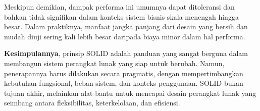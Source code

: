 Meskipun demikian, dampak performa ini umumnya dapat ditoleransi dan bahkan tidak signifikan dalam konteks sistem bisnis skala menengah hingga besar. Dalam praktiknya, manfaat jangka panjang dari desain yang bersih dan mudah diuji sering kali lebih besar daripada biaya minor dalam hal performa.

\textbf{Kesimpulannya}, prinsip SOLID adalah panduan yang sangat berguna dalam membangun sistem perangkat lunak yang siap untuk berubah. Namun, penerapannya harus dilakukan secara pragmatis, dengan mempertimbangkan kebutuhan fungsional, beban sistem, dan konteks penggunaan. SOLID bukan tujuan akhir, melainkan alat bantu untuk mencapai desain perangkat lunak yang seimbang antara fleksibilitas, keterkelolaan, dan efisiensi.


